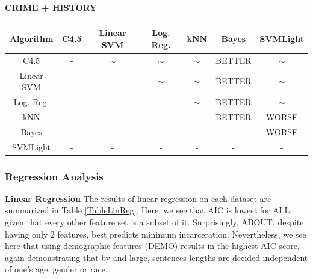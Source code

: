 \documentclass[11pt,letter]{article}
\begin{document}
\paragraph{CRIME + HISTORY} \quad

\begin{tabular}{|c|c|c|c|c|c|c|}
\hline
Algorithm & C4.5  & Linear SVM & Log. Reg.  & kNN  & Bayes & SVMLight \\
\hline
C4.5 	& -		& $\sim$	& $\sim$	& $\sim$	& BETTER	& $\sim$		\\
Linear SVM		& -		& -			& $\sim$	& $\sim$	& BETTER	& $\sim$		\\
Log. Reg. 	& -		& -			& -			& $\sim$	& BETTER	& $\sim$ 	\\
kNN 		& -		& -			& -			& -			& BETTER	& WORSE		\\
Bayes			& -		& -			& -			& -			& -			& WORSE		\\
SVMLight & - & - & - & - & - & - \\
\hline
\end{tabular}


\subsubsection{Regression Analysis}

\textbf{Linear Regression}
The results of linear regression on each dataset are summarized in Table \ref{TableLinReg}. Here, we see that AIC is lowest for ALL, given that every other feature set is a subset of it. Surprisingly, ABOUT, despite having only 2 features, best predicts minimum incarceration. Nevertheless, we see here that using demographic features (DEMO) results in the highest AIC score, again demonstrating that by-and-large, sentences lengths are decided independent of one's age, gender or race.
\end{document}
